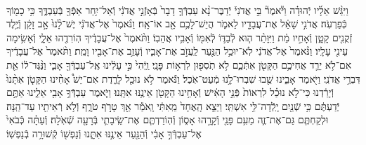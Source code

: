 \documentclass[twoside, openany, parskip=half, 11pt]{book}
\begin{document}
\begin{footnotesize}
\begin{multicols}{2}
\\
וַיִּגַּ֨שׁ אֵלָ֜יו יְֿהוּדָ֗ה וַיֹּ֘אמֶר֘ בִּ֣י אֲדֹנִי֒ יְֿדַבֶּר־נָ֨א עַבְדְּֿךָ֤ דָבָר֙ בְּֿאָזְֿנֵ֣י אֲדֹנִ֔י וְֿאַל־יִ֥חַר אַפְּֿךָ֖ בְּֿעַבְדֶּ֑ךָ כִּ֥י כָמ֖וֹךָ כְּֿפַרְעֹֽה׃ אֲדֹנִ֣י שָׁאַ֔ל אֶת־עֲבָדָ֖יו לֵאמֹ֑ר הֲיֵשׁ־לָכֶ֥ם אָ֖ב אוֹ־אָֽח׃ וַנֹּ֨אמֶר֙ אֶל־אֲדֹנִ֔י יֶשׁ־לָ֨נוּ֙ אָ֣ב זָקֵ֔ן וְֿיֶ֥לֶד זְֿקֻנִ֖ים קָטָ֑ן וְֿאָחִ֣יו מֵ֔ת וַיִּוָּתֵ֨ר ה֧וּא לְֿבַדּ֛וֹ לְֿאִמּ֖וֹ וְֿאָבִ֥יו אֲהֵבֽוֹ׃  וַתֹּ֨אמֶר֙ אֶל־עֲבָדֶ֔יךָ הֽוֹרִדֻ֖הוּ אֵלָ֑י וְֿאָשִׂ֥ימָה עֵינִ֖י עָלָֽיו׃ וַנֹּ֨אמֶר֙ אֶל־אֲדֹנִ֔י לֹֽא־יוּכַ֥ל הַנַּ֖עַר לַֽעֲזֹ֣ב אֶת־אָבִ֑יו וְֿעָזַ֥ב אֶת־אָבִ֖יו וָמֵֽת׃ וַתֹּ֨אמֶר֙ אֶל־עֲבָדֶ֔יךָ אִם־לֹ֥א יֵרֵ֛ד אֲחִיכֶ֥ם הַקָּטֹ֖ן אִתְּֿכֶ֑ם לֹ֥א תֹֽסִפ֖וּן לִרְא֥וֹת פָּנָֽי׃ וַֽיְֿהִי֙ כִּ֣י עָלִ֔ינוּ אֶֽל־עַבְדְּֿךָ֖ אָבִ֑י וַנַּ֨גֶּד־ל֔וֹ אֵ֖ת דִּבְרֵ֥י אֲדֹנִֽי׃  וַיֹּ֖אמֶר אָבִ֑ינוּ שֻׁ֖בוּ שִׁבְרוּ־לָ֥נוּ מְֿעַט־אֹֽכֶל׃ וַנֹּ֕אמֶר לֹ֥א נוּכַ֖ל לָרֶ֑דֶת אִם־יֵשׁ֩ אָחִ֨ינוּ הַקָּטֹ֤ן אִתָּ֨נוּ֙ וְֿיָרַ֔דְנוּ כִּי־לֹ֣א נוּכַ֗ל לִרְאוֹת֙ פְּֿנֵ֣י הָאִ֔ישׁ וְֿאָחִ֥ינוּ הַקָּטֹ֖ן אֵינֶ֥נּוּ אִתָּֽנוּ׃ וַיֹּ֛אמֶר עַבְדְּֿךָ֥ אָבִ֖י אֵלֵ֑ינוּ אַתֶּ֣ם יְֿדַעְתֶּ֔ם כִּ֥י שְֿׁנַ֖יִם יָֽלְֿדָה־לִּ֥י אִשְׁתִּֽי׃ וַיֵּצֵ֤א הָֽאֶחָד֙ מֵֽאִתִּ֔י וָֽאֹמַ֕ר אַ֖ךְ טָרֹ֣ף טֹרָ֑ף וְֿלֹ֥א רְֿאִיתִ֖יו עַד־הֵֽנָּה׃ וּלְקַחְתֶּ֧ם גַּם־אֶת־זֶ֛ה מֵעִ֥ם פָּנַ֖י וְֿקָרָ֣הוּ אָס֑וֹן וְֿהֽוֹרַדְתֶּ֧ם אֶת־שֵֽׂיבָתִ֛י בְּֿרָעָ֖ה שְֿׁאֹֽלָה׃ וְֿעַתָּ֗ה כְּֿבֹאִי֙ אֶל־עַבְדְּֿךָ֣ אָבִ֔י וְֿהַנַּ֖עַר אֵינֶ֣נּוּ אִתָּ֑נוּ וְֿנַפְשׁ֖וֹ קְֿשׁוּרָ֥ה בְֿנַפְשֽׁוֹ׃


\end{multicols}
\end{footnotesize}
\end{document}
